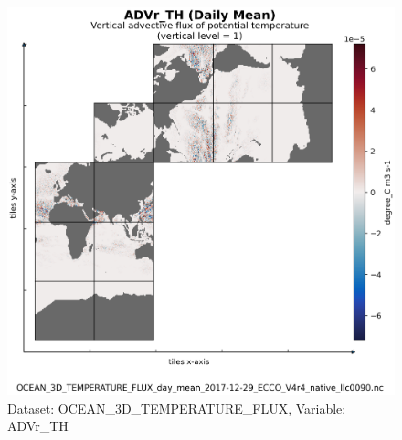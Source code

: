 \begin{figure}[H]
\centering
\includegraphics[scale=0.55]{../images/plots/native_plots/Ocean_Three-Dimensional_Potential_Temperature_Fluxes/ADVr_TH.png}
\caption{Dataset: OCEAN\_3D\_TEMPERATURE\_FLUX, Variable: ADVr\_TH}
\label{tab:table-OCEAN_3D_TEMPERATURE_FLUX_ADVr_TH-Plot}
\end{figure}
\newpage
\pagebreak

